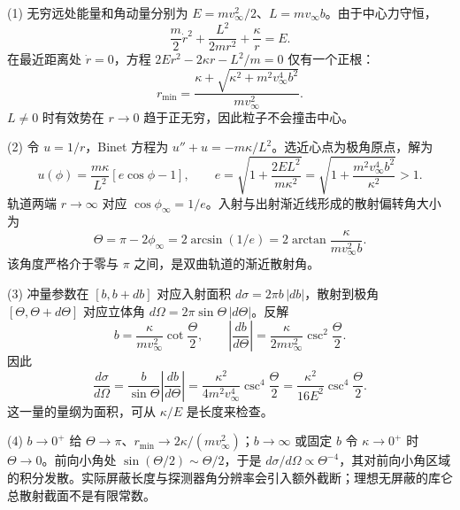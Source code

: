 (1) 无穷远处能量和角动量分别为 \(E=mv_\infty^2/2\)、\(L=mv_\infty b\)。由于中心力守恒，
\[
\frac m2\dot r^2+\frac{L^2}{2mr^2}+\frac\kappa r=E.
\]
在最近距离处 \(\dot r=0\)，方程 \(2Er^2-2\kappa r-L^2/m=0\) 仅有一个正根：
\[
r_{\min}=\frac{\kappa+\sqrt{\kappa^2+m^2v_\infty^4b^2}}{mv_\infty^2}.
\]
\(L\ne0\) 时有效势在 \(r\to0\) 趋于正无穷，因此粒子不会撞击中心。

(2) 令 \(u=1/r\)，Binet 方程为 \(u''+u=-m\kappa/L^2\)。选近心点为极角原点，解为
\[
u(\phi)=\frac{m\kappa}{L^2}[e\cos\phi-1],\qquad
e=\sqrt{1+\frac{2EL^2}{m\kappa^2}}
=\sqrt{1+\frac{m^2v_\infty^4b^2}{\kappa^2}}>1.
\]
轨道两端 \(r\to\infty\) 对应 \(\cos\phi_\infty=1/e\)。入射与出射渐近线形成的散射偏转角大小为
\[
\Theta=\pi-2\phi_\infty
=2\arcsin(1/e)
=2\arctan\frac{\kappa}{mv_\infty^2b}.
\]
该角度严格介于零与 \(\pi\) 之间，是双曲轨道的渐近散射角。

(3) 冲量参数在 \([b,b+db]\) 对应入射面积 \(d\sigma=2\pi b\,|db|\)，散射到极角 \([\Theta,\Theta+d\Theta]\) 对应立体角 \(d\Omega=2\pi\sin\Theta\,|d\Theta|\)。反解
\[
b=\frac{\kappa}{mv_\infty^2}\cot\frac\Theta2,\qquad
\left|\frac{db}{d\Theta}\right|=
\frac{\kappa}{2mv_\infty^2}\csc^2\frac\Theta2.
\]
因此
\[
\frac{d\sigma}{d\Omega}=\frac{b}{\sin\Theta}\left|\frac{db}{d\Theta}\right|
=\frac{\kappa^2}{4m^2v_\infty^4}\csc^4\frac\Theta2
=\frac{\kappa^2}{16E^2}\csc^4\frac\Theta2.
\]
这一量的量纲为面积，可从 \(\kappa/E\) 是长度来检查。

(4) \(b\to0^+\) 给 \(\Theta\to\pi\)、\(r_{\min}\to2\kappa/(mv_\infty^2)\)；\(b\to\infty\) 或固定 \(b\) 令 \(\kappa\to0^+\) 时 \(\Theta\to0\)。前向小角处 \(\sin(\Theta/2)\sim\Theta/2\)，于是 \(d\sigma/d\Omega\propto\Theta^{-4}\)，其对前向小角区域的积分发散。实际屏蔽长度与探测器角分辨率会引入额外截断；理想无屏蔽的库仑总散射截面不是有限常数。
